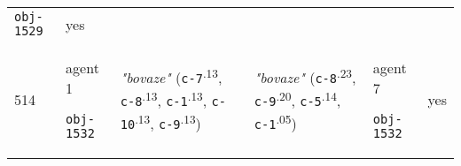 {\begin{tabular}{@{}p{0.3cm}p{0.9cm}p{6cm}p{6cm}p{0.9cm}p{0.55cm}@{}}
 \texttt{obj-1529} & yes \\
514 & agent 1 

\texttt{obj-1532} &\textit{"bovaze"} (\texttt{c-7}\textsuperscript{.13}, \texttt{c-8}\textsuperscript{.13}, \texttt{c-1}\textsuperscript{.13}, \texttt{c-10}\textsuperscript{.13}, \texttt{c-9}\textsuperscript{.13}) & \textit{"bovaze"} (\texttt{c-8}\textsuperscript{.23}, \texttt{c-9}\textsuperscript{.20}, \texttt{c-5}\textsuperscript{.14}, \texttt{c-1}\textsuperscript{.05}) & agent 7 

 \texttt{obj-1532} & yes \\

\end{tabular}}

